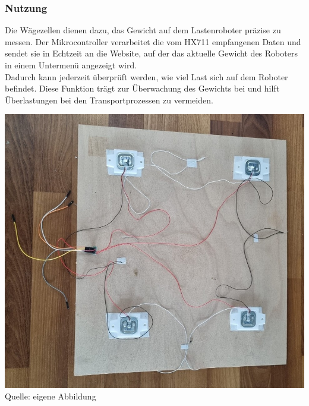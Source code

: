 \documentclass[ngerman,12pt,a4paper]{article}
\begin{document}
		\subsubsection{Nutzung}
		Die Wägezellen dienen dazu, das Gewicht auf dem Lastenroboter präzise zu messen. Der Mikrocontroller verarbeitet die vom HX711 empfangenen Daten und sendet sie in Echtzeit an die Website, auf der das aktuelle Gewicht des Roboters in einem Untermenü angezeigt wird. \\
		Dadurch kann jederzeit überprüft werden, wie viel Last sich auf dem Roboter befindet. Diese Funktion trägt zur Überwachung des Gewichts bei und hilft Überlastungen bei den Transportprozessen zu vermeiden.
		\begin{center}
			\begin{minipage}{0.8\textwidth}
				\centering
				\includegraphics[width=\textwidth]{Pictures/testaufbau_waegezellen}
				\label{fig:testaufbau_waegezellen}
				\vspace{-3pt}
				{\small Quelle: {eigene Abbildung}}
			\end{minipage}
		\end{center}
		
\end{document}
